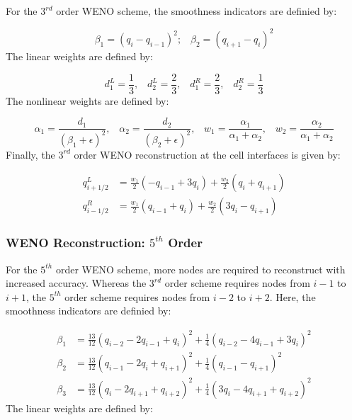 \documentclass[conf]{new-aiaa}
\begin{document}
For the $3^{rd}$ order WENO scheme, the smoothness indicators are definied by:

\begin{equation}
	\beta_1 = \left( q_i - q_{i-1} \right)^2 \textit{;} \quad
	\beta_2 = \left( q_{i+1} - q_i \right)^2
\end{equation}
The linear weights are defined by:

\begin{equation}
	d_1^L = \frac{1}{3} \textit{,} \quad
	d_2^L = \frac{2}{3} \textit{,} \quad
	d_1^R = \frac{2}{3} \textit{,} \quad
	d_2^R = \frac{1}{3}
\end{equation}
The nonlinear weights are defined by:

\begin{equation}
	\alpha_1 = \frac{d_1}{(\beta_1 + \epsilon)^2} \textit{,} \quad
	\alpha_2 = \frac{d_2}{(\beta_2 + \epsilon)^2} \textit{,} \quad
	w_1 = \frac{\alpha_1}{\alpha_1 + \alpha_2} \textit{,} \quad
	w_2 = \frac{\alpha_2}{\alpha_1 + \alpha_2}
\end{equation}
Finally, the $3^{rd}$ order WENO reconstruction at the cell interfaces is given
by:

\begin{equation}
	\begin{aligned}
		q_{i+1/2}^L &= \frac{w_1}{2}(-q_{i-1} + 3q_i) + \frac{w_2}{2}(q_i + q_{i+1}) \\
		q_{i-1/2}^R &= \frac{w_1}{2}(q_{i-1} + q_i) + \frac{w_2}{2}(3q_i - q_{i+1})
	\end{aligned}
\end{equation}

\subsubsection{WENO Reconstruction: \texorpdfstring{$5^{th}$}{5th} Order}

For the $5^{th}$ order WENO scheme, more nodes are required to reconstruct with
increased accuracy. Whereas the $3^{rd}$ order scheme requires nodes from $i-1$
to $i+1$, the $5^{th}$ order scheme requires nodes from $i-2$ to $i+2$. Here, the
smoothness indicators are definied by:

\begin{equation}
\begin{aligned}
\beta_1 &= \frac{13}{12} (q_{i-2} - 2q_{i-1} + q_i)^2 + \frac{1}{4} (q_{i-2} - 4q_{i-1} + 3q_i)^2 \\
\beta_2 &= \frac{13}{12} (q_{i-1} - 2q_i + q_{i+1})^2 + \frac{1}{4} (q_{i-1} - q_{i+1})^2 \\
\beta_3 &= \frac{13}{12} (q_i - 2q_{i+1} + q_{i+2})^2 + \frac{1}{4} (3q_i - 4q_{i+1} + q_{i+2})^2
\end{aligned}
\end{equation}
The linear weights are defined by:
\end{document}
